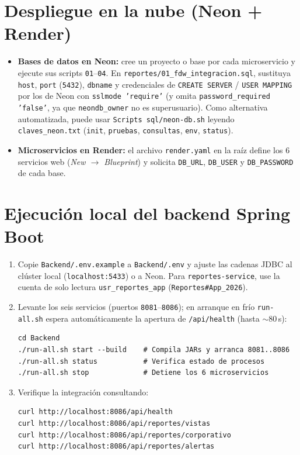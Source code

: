 \documentclass[11pt,oneside]{article}
\begin{document}
\section{Despliegue en la nube (Neon + Render)}

\begin{itemize}[leftmargin=1.5em, itemsep=3pt]
  \item \textbf{Bases de datos en Neon:} cree un proyecto o base por cada
        microservicio y ejecute sus scripts \texttt{01}--\texttt{04}. En
        \texttt{reportes/01\_fdw\_integracion.sql}, sustituya \texttt{host},
        \texttt{port} (\texttt{5432}), \texttt{dbname} y credenciales de
        \texttt{CREATE SERVER} / \texttt{USER MAPPING} por los de Neon con
        \texttt{sslmode 'require'} (y omita \texttt{password\_required 'false'},
        ya que \texttt{neondb\_owner} no es superusuario). Como alternativa
        automatizada, puede usar \texttt{Scripts sql/neon-db.sh} leyendo
        \texttt{claves\_neon.txt} (\texttt{init}, \texttt{pruebas},
        \texttt{consultas}, \texttt{env}, \texttt{status}).
  \item \textbf{Microservicios en Render:} el archivo \texttt{render.yaml} en
        la ra\'iz define los 6 servicios web (\textit{New $\to$ Blueprint}) y
        solicita \texttt{DB\_URL}, \texttt{DB\_USER} y \texttt{DB\_PASSWORD} de
        cada base.
\end{itemize}

\section{Ejecuci\'on local del backend Spring Boot}

\begin{enumerate}[leftmargin=1.5em, itemsep=3pt]
  \item Copie \texttt{Backend/.env.example} a \texttt{Backend/.env} y ajuste
        las cadenas JDBC al cl\'uster local (\texttt{localhost:5433}) o a Neon.
        Para \texttt{reportes-service}, use la cuenta de solo lectura
        \texttt{usr\_reportes\_app} (\texttt{Reportes\#App\_2026}).
  \item Levante los seis servicios (puertos \texttt{8081}--\texttt{8086}); en
        arranque en fr\'io \texttt{run-all.sh} espera autom\'aticamente la
        apertura de \texttt{/api/health} (hasta $\sim$80\,s):
\begin{verbatim}
cd Backend
./run-all.sh start --build    # Compila JARs y arranca 8081..8086
./run-all.sh status           # Verifica estado de procesos
./run-all.sh stop             # Detiene los 6 microservicios
\end{verbatim}
  \item Verifique la integraci\'on consultando:
\begin{verbatim}
curl http://localhost:8086/api/health
curl http://localhost:8086/api/reportes/vistas
curl http://localhost:8086/api/reportes/corporativo
curl http://localhost:8086/api/reportes/alertas
\end{verbatim}
\end{enumerate}
\end{document}
